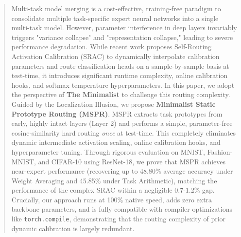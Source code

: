 \documentclass{article}
\theoremstyle{plain}
\theoremstyle{definition}
\theoremstyle{remark}
\begin{document}

\printAffiliationsAndNotice{}

\begin{abstract}
Multi-task model merging is a cost-effective, training-free paradigm to consolidate multiple task-specific expert neural networks into a single multi-task model. However, parameter interference in deep layers invariably triggers "variance collapse" and "representation collapse," leading to severe performance degradation. While recent work proposes Self-Routing Activation Calibration (SRAC) to dynamically interpolate calibration parameters and route classification heads on a sample-by-sample basis at test-time, it introduces significant runtime complexity, online calibration hooks, and softmax temperature hyperparameters. In this paper, we adopt the perspective of \textbf{The Minimalist} to challenge this routing complexity. Guided by the Localization Illusion, we propose \textbf{Minimalist Static Prototype Routing (MSPR)}. MSPR extracts task prototypes from early, highly intact layers (Layer 2) and performs a simple, parameter-free cosine-similarity hard routing \textit{once} at test-time. This completely eliminates dynamic intermediate activation scaling, online calibration hooks, and hyperparameter tuning. Through rigorous evaluation on MNIST, Fashion-MNIST, and CIFAR-10 using ResNet-18, we prove that MSPR achieves near-expert performance (recovering up to 48.80\% average accuracy under Weight Averaging and 45.85\% under Task Arithmetic), matching the performance of the complex SRAC within a negligible 0.7-1.2\% gap. Crucially, our approach runs at 100\% native speed, adds zero extra backbone parameters, and is fully compatible with compiler optimizations like \texttt{torch.compile}, demonstrating that the routing complexity of prior dynamic calibration is largely redundant.
\end{abstract}
\end{document}
